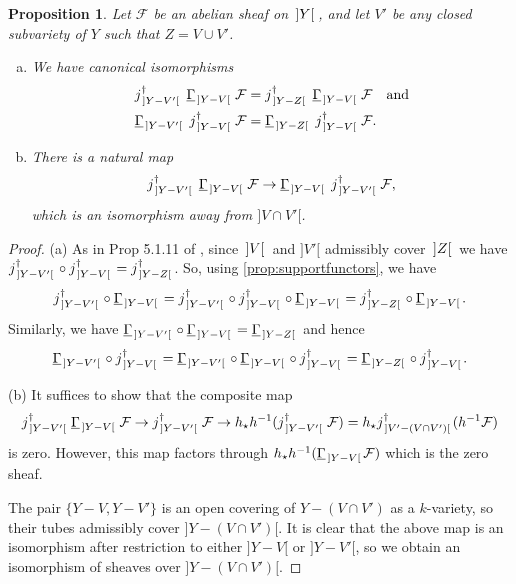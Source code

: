 \documentclass[cjm]{ipart}
\theoremstyle{plain}
\newtheorem{proposition}[theorem]{Proposition}
\theoremstyle{remark}
\DeclarePairedDelimiter{\tb}{{\,]}}{{[\, }} %
\newcommand{\cF}{\mathcal{F}}
\newcommand{\uGa}{\underline{\Gamma}}
\numberwithin{equation}{subsection}
\begin{document}
\WFclear

  \begin{proposition}
   \label{prop:fiddlysupports}
   Let $\cF$ be an abelian sheaf on $\tb{Y}$, and let $V'$ be any closed subvariety of $Y$ such that $Z = V \cup V'$.
   \begin{enumerate}[(a)]
    \item We have canonical isomorphisms
    \begin{align*}
     j^{\dag}_{\tb{Y - V'}}\ \uGa_{\tb{Y - V}}\, \cF &= j^{\dag}_{\tb{Y - Z}}\ \uGa_{\tb{Y - V}}\, \cF \quad\text{and}\\
     \uGa_{\tb{Y - V'}}\ j^{\dag}_{\tb{Y - V}}\, \cF &=  \uGa_{\tb{Y - Z}}\ j^{\dag}_{\tb{Y - V}}\, \cF.
    \end{align*}

    \item There is a natural map
    \[  j^{\dag}_{\tb{Y - V'}}\ \uGa_{\tb{Y - V}}\, \cF \to \uGa_{\tb{Y-V}}\ j^{\dag}_{\tb{Y-V'}}\,\cF,\]
    which is an isomorphism away from $]V \cap V'[$.
   \end{enumerate}
  \end{proposition}

  \begin{proof}
   (a) As in Prop 5.1.11 of \cite{lestum07}, since $\tb{V}$ and $]V'[$ admissibly cover $\tb{Z}$ we have $j^{\dag}_{\tb{Y - V'}}\circ j^{\dag}_{\tb{Y - V}} = j^{\dag}_{\tb{Y - Z}}$. So, using \cref{prop:supportfunctors}, we have
   \[ j^{\dag}_{\tb{Y - V'}}\circ \uGa_{\tb{Y - V}} = j^{\dag}_{\tb{Y - V'}}\circ j^{\dag}_{\tb{Y - V}}\circ \uGa_{\tb{Y - V}} = j^{\dag}_{\tb{Y - Z}}\circ \uGa_{\tb{Y - V}}.\]
   Similarly, we have $\uGa_{\tb{Y - V'}} \circ \uGa_{\tb{Y - V}} = \uGa_{\tb{Y - Z}}$ and hence
   \[ \uGa_{\tb{Y - V'}}\circ j^{\dag}_{\tb{Y - V}} = \uGa_{\tb{Y - V'}}\circ \uGa_{\tb{Y - V}}\circ j^{\dag}_{\tb{Y - V}} =  \uGa_{\tb{Y - Z}}\circ j^{\dag}_{\tb{Y - V}}. \]

   (b) It suffices to show that the composite map 
   \[j^\dag_{\tb{Y - V'}}\, \uGa_{\tb{Y-V}}\, \cF \to j^\dag_{\tb{Y-V'}}\, \cF \to h_\star h^{-1}(j^\dag_{\tb{Y-V'}}\, \cF) = h_\star j^\dag_{\tb{V' - (V \cap V')}} (h^{-1}\cF)\]
   is zero. However, this map factors through $h_\star h^{-1}(\uGa_{\tb{Y-V}} \cF)$ which is the zero sheaf.

   The pair $\{ Y - V, Y - V'\}$ is an open covering of $Y - (V \cap V')$ as a $k$-variety, so their tubes admissibly cover $]Y - (V \cap V')[$. It is clear that the above map is an isomorphism after restriction to either $]Y - V[$ or $]Y - V'[$, so we obtain an isomorphism of sheaves over $]Y- (V \cap V')[$.
  \end{proof}
\end{document}
